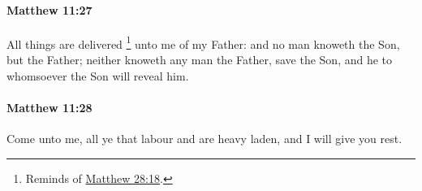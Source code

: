 		\paragraph{Matthew 11:27} %
			\label{MATTHEW-11-27}

			All things are delivered%
				\footnote{%
					Reminds of \hyperref[MATTHEW-28-18]{Matthew 28:18}.
					}
			unto me of my Father: and no man knoweth the Son, but the Father; neither knoweth any man the Father, save the Son, and he to whomsoever the Son will reveal him.

			\begin{framed}
			\scriptsize
				\begin{compactdesc}
					\item[SBLG]  \hyperref[EPIGINOSKO]{}  \hyperref[EPIGINOSKO]{} 
				\end{compactdesc}
			\end{framed}

		\paragraph{Matthew 11:28} %
			\label{MATTHEW-11-28}

			Come unto me, all ye that labour and are heavy laden, and I will give you rest.

